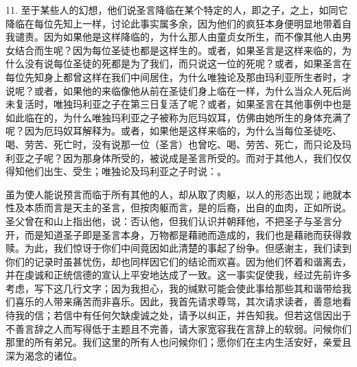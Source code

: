 11. 至于某些人的幻想，他们说圣言降临在某个特定的人，即之子，之上，如同它降临在每位先知上一样，讨论此事实属多余，因为他们的疯狂本身便明显地带着自我谴责。因为如果他是这样降临的，为什么那人由童贞女所生，而不像其他人由男女结合而生呢？因为每位圣徒也都是这样生的。或者，如果圣言是这样来临的，为什么没有说每位圣徒的死都是为了我们，而只说这一位的死呢？或者，如果圣言在每位先知身上都曾这样在我们中间居住，为什么唯独论及那由玛利亚所生者时，才说呢？或者，如果他的来临像他从前在圣徒们身上临在一样，为什么当众人死后尚未复活时，唯独玛利亚之子在第三日复活了呢？或者，如果圣言在其他事例中也是如此临在的，为什么唯独玛利亚之子被称为厄玛奴耳，仿佛由她所生的身体充满了呢？因为厄玛奴耳解释为。或者，如果他是这样来临的，为什么当每位圣徒吃、喝、劳苦、死亡时，没有说那一位（圣言）也曾吃、喝、劳苦、死亡，而只论及玛利亚之子呢？因为那身体所受的，被说成是圣言所受的。而对于其他人，我们仅仅得知他们出生、受生；唯独论及玛利亚之子时说：。\par

虽为使人能说预言而临于所有其他的人，却从取了肉躯，以人的形态出现；祂就本性及本质而言是天主的圣言，但按肉躯而言，是的后裔，出自的血肉，正如所说。圣父曾在和山上指出他，说：否认他，但我们认识并朝拜他，不把圣子与圣言分开，而是知道圣子即是圣言本身，万物都是藉祂而造成的，我们也是藉祂而获得救赎。为此，我们惊讶于你们中间竟因如此清楚的事起了纷争。但感谢主，我们读到你们的记录时虽甚忧伤，却也同样因它们的结论而欢喜。因为他们怀着和谐离去，并在虔诚和正统信德的宣认上平安地达成了一致。这一事实促使我，经过先前许多考虑，写下这几行文字；因为我担心，我的缄默可能会使此事给那些其和谐带给我们喜乐的人带来痛苦而非喜乐。因此，我首先请求尊驾，其次请求读者，善意地看待我的信；若信中有任何欠缺虔诚之处，请予以纠正，并告知我。但若这信因出于不善言辞之人而写得低于主题且不完善，请大家宽容我在言辞上的软弱。问候你们那里的所有弟兄。我们这里的所有人也问候你们；愿你们在主内生活安好，亲爱且深为渴念的诸位。\par



